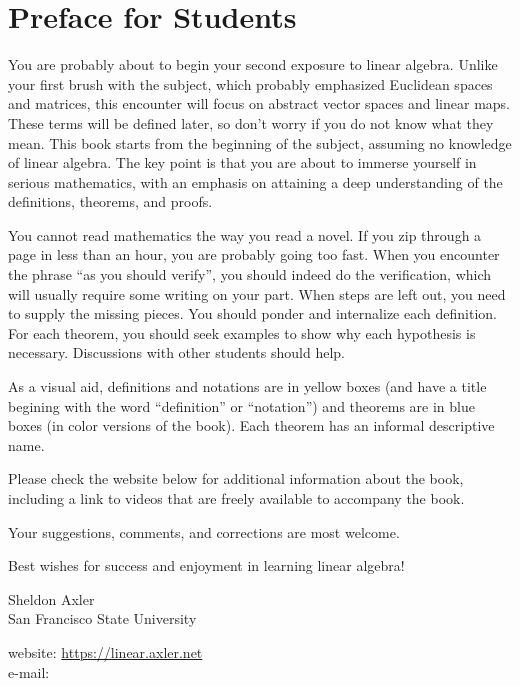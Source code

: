 
\section{Preface for Students} \label{forStudents}

You are probably about to begin your second exposure to linear
algebra. Unlike your first brush with the subject, which probably emphasized
Euclidean spaces and matrices, this encounter will focus on abstract vector
spaces and linear maps. These terms will be defined later, so don't
worry if you do not know what they mean. This book starts from the
beginning of the subject, assuming no knowledge of linear algebra.
The key point is that you are about to immerse yourself in serious
mathematics, with an emphasis on attaining a deep understanding
of the definitions, theorems, and proofs.

You cannot read mathematics the way you read a novel.  If you zip
through a page in less than an hour, you are probably going too fast.
When you encounter the phrase ``as you should verify''\!, you should
indeed do the verification, which will usually require some writing on
your part. When steps are left out, you need to supply the missing
pieces. You should ponder and internalize each definition. For each
theorem, you should seek examples to show why each hypothesis is
necessary. Discussions with other students should help.

As a visual aid, definitions and notations are in yellow boxes (and have a title begining with the word ``{\small\textsf{definition}}'' or ``{\small\textsf{notation}}'') and theorems are in blue boxes (in color versions of the book). Each theorem has an informal descriptive name.



Please check the website below for additional information about the book, including a link to videos that are freely available to accompany the book.

Your suggestions, comments, and corrections are most welcome.

Best wishes for success and enjoyment in learning linear algebra!

\bigskip

{
\setlength{\parindent}{0bp}
Sheldon Axler \\
San Francisco State University

\medskip

website: \url{https://linear.axler.net}\\
e-mail: 
}


